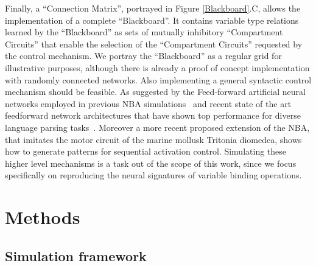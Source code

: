 \documentclass[10pt]{article}
\begin{document}
Finally, a ``Connection Matrix'', portrayed in Figure {\ref{Blackboard}}.C, allows the implementation of a complete ``Blackboard''.
It contains variable type relations learned by the ``Blackboard'' as sets of mutually inhibitory ``Compartment Circuits'' that enable the selection of the 
``Compartment Circuits'' requested by the control mechanism.
We portray the ``Blackboard'' as a regular grid for illustrative purposes, although there is already a proof of concept implementation with 
randomly connected networks\cite{van_der_Velde_2011}.
Also implementing a general syntactic control mechanism should be feasible. As suggested by the Feed-forward artificial 
neural networks employed in previous NBA simulations~\cite{van_der_Velde_2010} and recent state of the art feedforward network architectures that have shown top performance for diverse language parsing tasks~\cite{andor2016globally}.
Moreover a more recent proposed extension of the NBA, that imitates the motor circuit of the marine mollusk Tritonia diomedea, 
shows how to generate patterns for sequential activation control\cite{van_Dijk_2015}.
Simulating these higher level mechanisms is a task out of the scope of this work, since we focus specifically on reproducing the neural signatures of variable binding operations.


\section{Methods}

{\label{488128}}

\subsection{Simulation framework}\label{simulation-framework}
\end{document}
